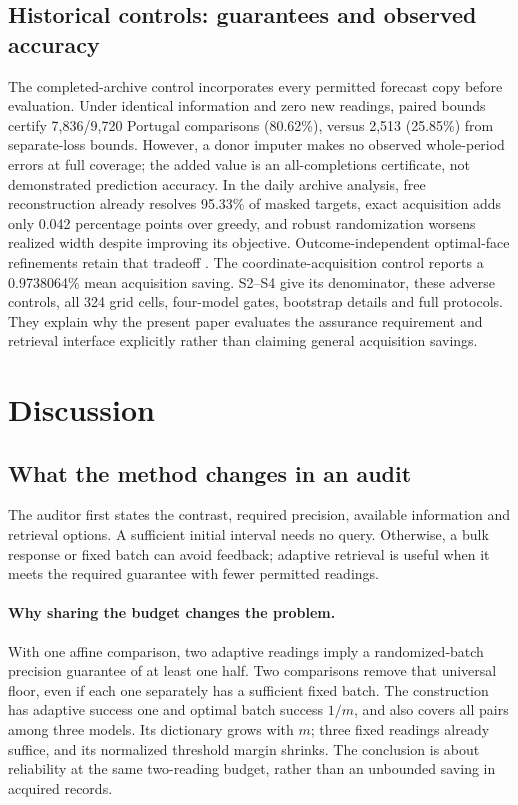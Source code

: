 \documentclass[12pt]{article}
\begin{document}
\subsection{Historical controls: guarantees and observed accuracy}
\label{sec:historical-application}
The completed-archive control \citep{portugal,uci} incorporates every permitted forecast
copy before evaluation. Under identical information and zero new readings,
paired bounds certify 7,836/9,720 Portugal comparisons (80.62\%), versus
2,513 (25.85\%) from separate-loss bounds. However, a donor imputer makes
no observed whole-period errors at full coverage; the added value is an
all-completions certificate, not demonstrated prediction accuracy.
In the daily archive analysis, free reconstruction already resolves 95.33\%
of masked targets, exact acquisition adds only 0.042 percentage points over
greedy, and robust randomization worsens realized width despite improving
its objective. Outcome-independent optimal-face refinements retain that
tradeoff \citep{iancu2014}. The coordinate-acquisition control reports a
0.9738064\% mean acquisition saving. S2--S4 give its denominator, these adverse controls,
all 324 grid cells, four-model gates, bootstrap details and full protocols.
They explain why the present paper evaluates the assurance requirement and
retrieval interface explicitly rather than claiming general acquisition savings.
\section{Discussion}\subsection{What the method changes in an audit}
The auditor first states the contrast, required precision, available
information and retrieval options. A sufficient initial interval
needs no query. Otherwise, a bulk response or fixed batch can avoid feedback;
adaptive retrieval is useful when it meets the required guarantee with fewer
permitted readings.

\paragraph{Why sharing the budget changes the problem.}
With one affine comparison, two adaptive readings imply a randomized-batch
precision guarantee of at least one half. Two comparisons remove that
universal floor, even if each one separately has a sufficient fixed batch.
The construction has adaptive success one and optimal batch success $1/m$,
and also covers all pairs among three models. Its dictionary grows with $m$;
three fixed readings already suffice, and its normalized threshold margin
shrinks. The conclusion is about reliability at the same two-reading budget,
rather than an unbounded saving in acquired records.
\end{document}
